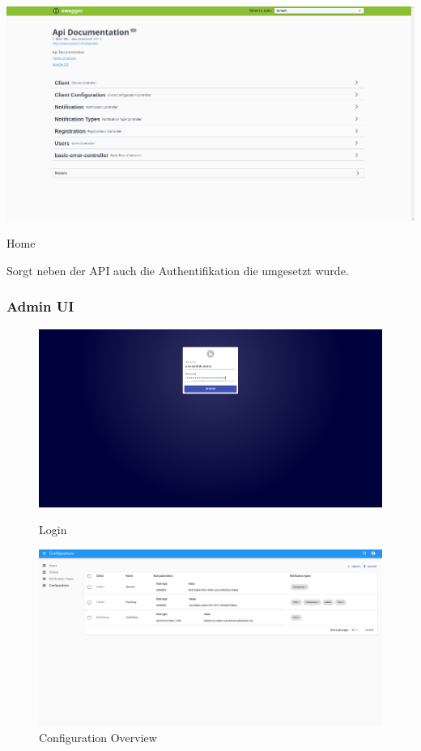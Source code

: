 \begin{minipage}[b]{1\textwidth}
    \includegraphics[width=\textwidth]{graphics/screenshots/cloud/swagger-home}
    \caption{Home}
\end{minipage}

Sorgt neben der API auch die Authentifikation die umgesetzt wurde.

\clearpage

\subsubsection{Admin UI}

\begin{figure}[h]
    \centering
    \begin{minipage}[b]{0.4\textwidth}
        \includegraphics[width=\textwidth]{graphics/screenshots/adminui/login}
        \caption{Login}
    \end{minipage}
    \hfill
    \begin{minipage}[b]{0.4\textwidth}
        \includegraphics[width=\textwidth]{graphics/screenshots/adminui/configuration-all}
        \caption{Configuration Overview}
    \end{minipage}
    \label{fig:AdminUI-Screens1}
\end{figure}

